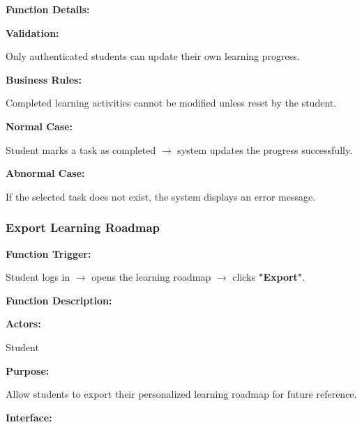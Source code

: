 \vspace{0.3cm}

\textbf{Function Details:}

\textbf{Validation:}

Only authenticated students can update their own learning progress.

\textbf{Business Rules:}

Completed learning activities cannot be modified unless reset by the student.

\textbf{Normal Case:}

Student marks a task as completed $\rightarrow$ system updates the progress successfully.

\textbf{Abnormal Case:}

If the selected task does not exist, the system displays an error message.

%

\subsubsection{Export Learning Roadmap}

\textbf{Function Trigger:}

Student logs in $\rightarrow$ opens the learning roadmap $\rightarrow$ clicks \textbf{"Export"}.

\vspace{0.3cm}

\textbf{Function Description:}

\textbf{Actors:}

Student

\vspace{0.2cm}

\textbf{Purpose:}

Allow students to export their personalized learning roadmap for future reference.

\vspace{0.2cm}

\textbf{Interface:}

